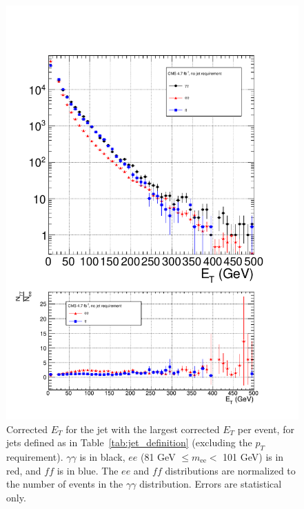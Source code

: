 \documentclass[dissertation.tex]{subfiles}
\begin{document}
\begin{figure}
	\centering
	\includegraphics[scale=0.5]{hadronic_activity_j1ET}
	\caption{Corrected $E_{T}$ for the jet with the largest corrected $E_{T}$ per event, for jets defined as in Table~\ref{tab:jet_definition} (excluding the $p_{T}$ requirement).  $\gamma\gamma$ is in black, $ee$ (81 GeV $\leq m_{\mathrm{ee}} <$ 101 GeV) is in red, and $\mathit{ff}$ is in blue.  The $ee$ and $\mathit{ff}$ distributions are normalized to the number of events in the $\gamma\gamma$ distribution.  Errors are statistical only.}
	\label{fig:hadronic_activity_j1ET}
\end{figure}
\end{document}
